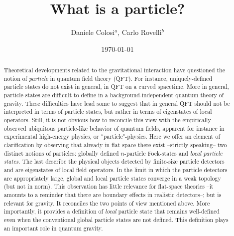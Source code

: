 \documentclass[11pt, nofootinbib]{revtex4-2}
\begin{document}
\title{\Large\bf What is a particle?}

\author{Daniele Colosi${}^a$, Carlo Rovelli${}^b$}




\bigskip

\date{\small\today} 

\begin{abstract} 
\noindent 

\noindent Theoretical developments related to the gravitational interaction 
have questioned the
notion of \emph{particle} in quantum field theory (QFT).  For
instance, uniquely-defined particle states do not exist in general, 
in QFT on a curved spacetime. More in general, particle
states are difficult to define in a background-independent quantum 
theory of gravity.  These difficulties
have lead some to suggest that in general QFT should not be
interpreted in terms of particle states, but rather in terms of
eigenstates of {local} operators.  Still, it is not
obvious how to reconcile this view with the empirically-observed
ubiquitous particle-like behavior of quantum fields, apparent
for instance in experimental high-energy physics, or ``particle"-physics.  Here we offer
an element of clarification by observing that already in flat space
there exist --strictly speaking-- {two} distinct notions of particles:
globally defined $n$-particle Fock-states and \emph{local particle
states}.  The last describe the physical objects detected by
finite-size particle detectors and  {are}  eigenstates of local
field operators.  In the limit in which the particle detectors are
appropriately large, global and local
particle states converge in a weak topology (but not in norm).  This
observation has little relevance for flat-space 
theories --it amounts to a reminder that there are boundary
effects in realistic detectors--; but is relevant for gravity. It reconciles the two points of
view mentioned above. More importantly, it provides a definition of
{\em local} particle state that remains well-defined even when the conventional
global particle states are not defined.  This definition plays an
important role in quantum gravity.
\end{abstract}
\maketitle
\end{document}
